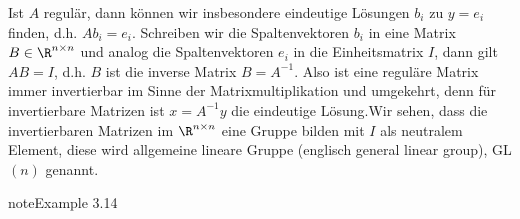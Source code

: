\documentclass[letterpaper,10pt,english]{jupyterBook}
\begin{document}
Ist \(A\) regulär, dann können wir insbesondere eindeutige Lösungen \(b_i\) zu \(y=e_i\) finden, d.h. \(A b_i = e_i\). Schreiben wir die Spaltenvektoren \(b_i\) in eine Matrix \(B \in \R^{n \times n}\) und analog die Spaltenvektoren \(e_i\) in die Einheitsmatrix \(I\), dann gilt \(AB=I\), d.h. \(B\) ist die inverse Matrix \(B=A^{-1}\). Also ist eine reguläre Matrix immer invertierbar im Sinne der Matrixmultiplikation und umgekehrt, denn für invertierbare Matrizen ist \(x=A^{-1}y\) die eindeutige Lösung.Wir sehen, dass die invertierbaren Matrizen im \(\R^{n \times n}\) eine Gruppe bilden mit \(I\) als neutralem Element, diese wird allgemeine lineare Gruppe (englisch general linear group), GL\((n)\) genannt.
\label{vektorraeume/LGS:example-9}
\begin{sphinxadmonition}{note}{Example 3.14}




\end{sphinxadmonition}
\end{document}
